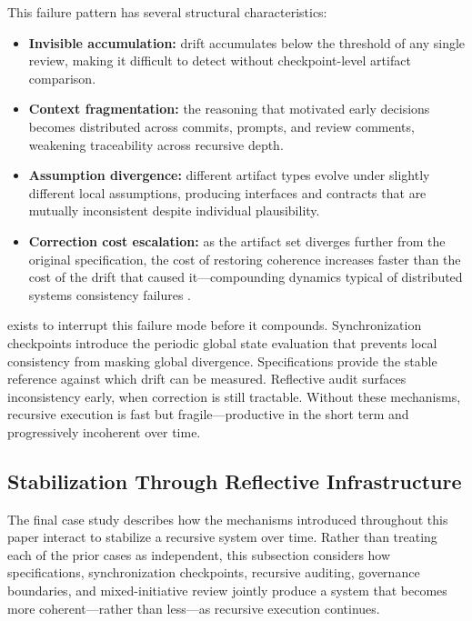 This failure pattern has several structural characteristics:
\begin{itemize}
  \item \textbf{Invisible accumulation:} drift accumulates below the threshold of any single review, making it difficult to detect without checkpoint-level artifact comparison.
  \item \textbf{Context fragmentation:} the reasoning that motivated early decisions becomes distributed across commits, prompts, and review comments, weakening traceability across recursive depth.
  \item \textbf{Assumption divergence:} different artifact types evolve under slightly different local assumptions, producing interfaces and contracts that are mutually inconsistent despite individual plausibility.
  \item \textbf{Correction cost escalation:} as the artifact set diverges further from the original specification, the cost of restoring coherence increases faster than the cost of the drift that caused it---compounding dynamics typical of distributed systems consistency failures \cite{Vogels2009EventuallyConsistent,Lamport1978TimeClocks}.
\end{itemize}

 exists to interrupt this failure mode before it compounds. Synchronization checkpoints introduce the periodic global state evaluation that prevents local consistency from masking global divergence. Specifications provide the stable reference against which drift can be measured. Reflective audit surfaces inconsistency early, when correction is still tractable. Without these mechanisms, recursive execution is fast but fragile---productive in the short term and progressively incoherent over time.

\subsection{Stabilization Through Reflective Infrastructure}

The final case study describes how the mechanisms introduced throughout this paper interact to stabilize a recursive system over time. Rather than treating each of the prior cases as independent, this subsection considers how specifications, synchronization checkpoints, recursive auditing, governance boundaries, and mixed-initiative review jointly produce a system that becomes more coherent---rather than less---as recursive execution continues.

